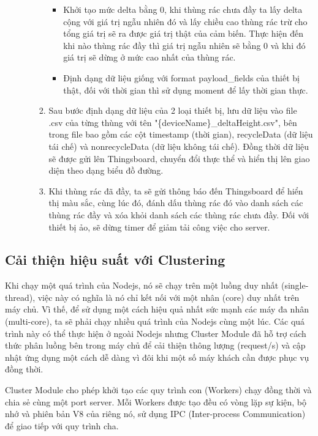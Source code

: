 \begin{itemize}
\begin{itemize}
\begin{enumerate}
\begin{itemize}
                \item Khởi tạo mức delta bằng 0, khi thùng rác chưa đầy ta lấy delta cộng với giá trị ngẫu nhiên đó và lấy chiều cao thùng rác trừ cho tổng giá trị sẽ ra được giá trị thật của cảm biến. Thực hiện đến khi nào thùng rác đầy thì giá trị ngẫu nhiên sẽ bằng 0 và khi đó giá trị sẽ dừng ở mức cao nhất của thùng rác.  
                \item Định dạng dữ liệu giống với format payload\_fields của thiết bị thật, đối với thời gian thì sử dụng moment để lấy thời gian thực. 
            \end{itemize}
            \item Sau bước định dạng dữ liệu của 2 loại thiết bị, lưu dữ liệu vào file .csv của từng thùng với tên "\{deviceName\}\_deltaHeight.csv", bên trong file bao gồm các cột timestamp (thời gian), recycleData (dữ liệu tái chế) và nonrecycleData (dữ liệu không tái chế). Đồng thời dữ liệu sẽ được gửi lên Thingsboard, chuyển đổi thực thể và hiển thị lên giao diện theo dạng biểu đồ đường.
            \item Khi thùng rác đã đầy, ta sẽ gửi thông báo đến Thingsboard để hiển thị màu sắc, cùng lúc đó, đánh dấu thùng rác đó vào danh sách các thùng rác đầy và xóa khỏi danh sách các thùng rác chưa đầy. Đối với thiết bị ảo, sẽ dừng timer để giảm tải công việc cho server.
        \end{enumerate}
    \end{itemize}
\end{itemize}

\subsection{Cải thiện hiệu suất với Clustering}
Khi chạy một quá trình của Nodejs, nó sẽ chạy trên một luồng duy nhất (single-thread), việc này có nghĩa là nó chỉ kết nối với một nhân (core) duy nhất trên máy chủ. Vì thế, để sử dụng một cách hiệu quả nhất sức mạnh các máy đa nhân (multi-core), ta sẽ phải chạy nhiều quá trình của Nodejs cùng một lúc. Các quá trình này có thể thực hiện ở ngoài Nodejs nhưng Cluster Module đã hỗ trợ cách thức phân luồng bên trong máy chủ để cải thiện thông lượng (request/s) và cập nhật ứng dụng một cách dễ dàng vì đôi khi một số máy khách cần được phục vụ đồng thời.

Cluster Module cho phép khởi tạo các quy trình con (Workers) chạy đồng thời và chia sẻ cùng một port server. Mỗi Workers được tạo đều có vòng lặp sự kiện, bộ nhớ và phiên bản V8 của riêng nó, sử dụng IPC (Inter-process Communication) để giao tiếp với quy trình cha.

